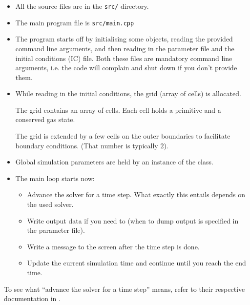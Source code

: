 \begin{itemize}

\item All the source files are in the \verb|src/| directory.

\item The main program file is \verb|src/main.cpp|

\item The program starts off by initialising some objects, reading the provided
command line arguments, and then reading in the parameter file and the initial
conditions (IC) file. Both these files are mandatory command line arguments,
i.e. the code will complain and shut down if you don't provide them.

\item While reading in the initial conditions, the grid (array of cells) is
allocated.

The grid contains an array of cells. Each cell holds a primitive and a
conserved gas state.

The grid is extended by a few cells on the outer boundaries to facilitate
boundary conditions. (That number is typically 2).

\item Global simulation parameters are held by an instance of the
 class.

\item The main loop starts now:

\begin{itemize}
    \item Advance the solver for a time step. What exactly this entails depends
on the used solver.

    \item Write output data if you need to (when to dump output is specified in
the parameter file).

    \item Write a message to the screen after the time step is done.

    \item Update the current simulation time and continue until you reach the
end time.
\end{itemize}
\end{itemize}



To see what ``advance the solver for a time step'' means, refer to their
respective documentation in .









